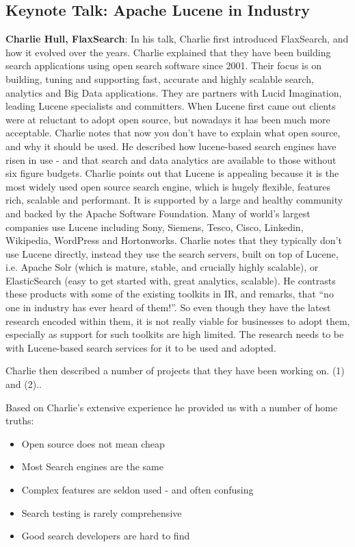 \subsection*{Keynote Talk: Apache Lucene in Industry} 
{\bf Charlie Hull, FlaxSearch}: In his talk, Charlie first introduced FlaxSearch, and how it evolved over the years. Charlie explained that they have been building search applications using open search software since 2001. Their focus is on building, tuning and supporting fast, accurate and highly scalable search, analytics and Big Data applications. They are partners with Lucid Imagination, leading Lucene specialists and committers. When Lucene first came out clients were at reluctant to adopt open source, but nowadays it has been much more acceptable. Charlie notes that now you don't have to explain what open source, and why it should be used. He described how lucene-based search engines have risen in use - and that search and data analytics are available to those without six figure budgets. Charlie points out that Lucene is appealing because it is the most widely used open source search engine, which is hugely flexible, features rich, scalable and performant. It is supported by a large and healthy community and backed by the Apache Software Foundation. Many of world's largest companies use Lucene including Sony, Siemens, Tesco, Cisco, Linkedin, Wikipedia, WordPress and Hortonworks. Charlie notes that they typically don't use Lucene directly, instead they use the search servers, built on top of Lucene, i.e. Apache Solr (which is mature, stable, and crucially highly scalable), or ElasticSearch (easy to get started with, great analytics, scalable). He contrasts these products with some of the existing toolkits in IR, and remarks, that ``no one in industry has ever heard of them!''. So even though they have the latest research encoded within them, it is not really viable for businesses to adopt them, especially as support for such toolkits are high limited. The research needs to be with Lucene-based search services for it to be used and adopted. 

Charlie then described a number of projects that they have been working on. (1) and (2)..

Based on Charlie's extensive experience he provided us with a number of home truths:
\begin{itemize}
	\item Open source does not mean cheap 
	\item Most Search engines are the same 
	\item Complex features are seldon used - and often confusing
	\item Search testing is rarely comprehensive
	\item Good search developers are hard to find
\end{itemize}


